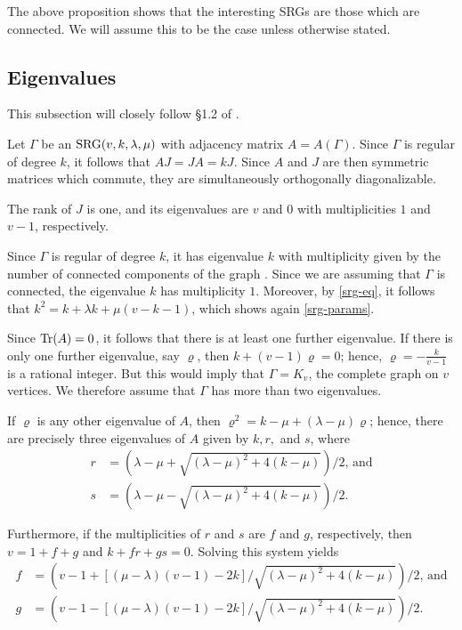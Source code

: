 \documentclass[../../../main]{subfiles}
\begin{document}
 The above proposition shows that the interesting SRGs are those which are connected. We will assume this to be the case unless otherwise stated.
 
 \dinkus

\subsection{Eigenvalues}

This subsection will closely follow \S1.2 of \cite{bannai2021algebraic}.

Let $\Gamma$ be an $\text{SRG}(v,k,\lambda,\mu)$ with adjacency matrix $A=A(\Gamma)$. Since $\Gamma$ is regular of degree $k$, it follows that $AJ=JA=kJ$. Since $A$ and $J$ are then symmetric matrices which commute, they are simultaneously orthogonally diagonalizable.

The rank of $J$ is one, and its eigenvalues are $v$ and $0$ with multiplicities $1$ and $v-1$, respectively. 

Since $\Gamma$ is regular of degree $k$, it has eigenvalue $k$ with multiplicity given by the number of connected components of the graph \cite[see][Theorem 1.5]{bannaialgebraic}. Since we are assuming that $\Gamma$ is connected, the eigenvalue $k$ has multiplicity $1$. Moreover, by \ref{srg-eq}, it follows that $k^2=k+\lambda k+\mu(v-k-1)$, which shows again \ref{srg-params}.

Since $\text{Tr}(A)=0$, it follows that there is at least one further eigenvalue. If there is only one further eigenvalue, say $\varrho$, then $k+(v-1)\varrho=0$; hence, $\varrho=-\frac{k}{v-1}$ is a rational integer. But this would imply that $\Gamma=K_v$, the complete graph on $v$ vertices. We therefore assume that $\Gamma$ has more than two eigenvalues.

If $\varrho$ is any other eigenvalue of $A$, then $\varrho^2=k-\mu+(\lambda-\mu)\varrho$; hence, there are precisely three eigenvalues of $A$ given by $k,r,$ and $s$, where
\begin{align*}
r &= (\lambda-\mu+\sqrt{(\lambda-\mu)^2+4(k-\mu)})/2 \text{, and} \\
s &= (\lambda-\mu-\sqrt{(\lambda-\mu)^2+4(k-\mu)})/2. 
\end{align*}

Furthermore, if the multiplicities of $r$ and $s$ are $f$ and $g$, respectively, then $v=1+f+g$ and $k+fr+gs=0$. Solving this system yields 
\begin{align*}
f &= (v-1+[(\mu-\lambda)(v-1)-2k]/\sqrt{(\lambda-\mu)^2+4(k-\mu)})/2 \text{, and} \\ 
g &= (v-1-[(\mu-\lambda)(v-1)-2k]/\sqrt{(\lambda-\mu)^2+4(k-\mu)})/2.
\end{align*}
\end{document}
